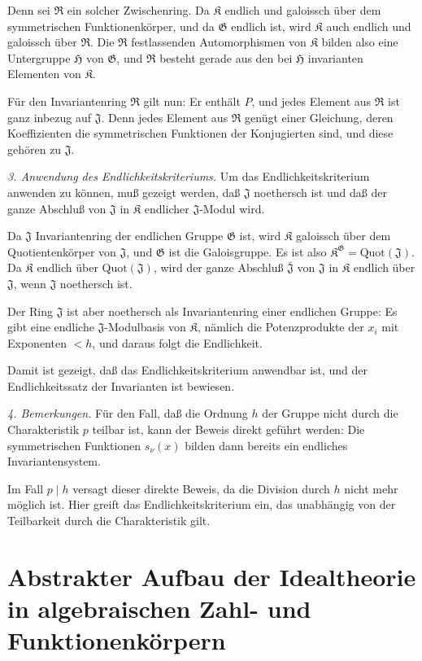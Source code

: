 \documentclass[12pt,a4paper]{article}
\newcommand{\fR}{\mathfrak{R}}
\newcommand{\fG}{\mathfrak{G}}
\newcommand{\fJ}{\mathfrak{J}}
\newcommand{\fK}{\mathfrak{K}}
\theoremstyle{plain}
\theoremstyle{definition}
\theoremstyle{remark}
\begin{document}
Denn sei $\fR$ ein solcher Zwischenring. Da $\fK$ endlich und galoissch über dem symmetrischen Funktionenkörper, und da $\fG$ endlich ist, wird $\fK$ auch endlich und galoissch über $\fR$. Die $\fR$ festlassenden Automorphismen von $\fK$ bilden also eine Untergruppe $\mathfrak{H}$ von $\fG$, und $\fR$ besteht gerade aus den bei $\mathfrak{H}$ invarianten Elementen von $\fK$.

Für den Invariantenring $\fR$ gilt nun: Er enthält $P$, und jedes Element aus $\fR$ ist ganz inbezug auf $\fJ$. Denn jedes Element aus $\fR$ genügt einer Gleichung, deren Koeffizienten die symmetrischen Funktionen der Konjugierten sind, und diese gehören zu $\fJ$.

\textit{3. Anwendung des Endlichkeitskriteriums.} Um das Endlichkeitskriterium anwenden zu können, muß gezeigt werden, daß $\fJ$ noethersch ist und daß der ganze Abschluß von $\fJ$ in $\fK$ endlicher $\fJ$-Modul wird.

Da $\fJ$ Invariantenring der endlichen Gruppe $\fG$ ist, wird $\fK$ galoissch über dem Quotientenkörper von $\fJ$, und $\fG$ ist die Galoisgruppe. Es ist also $\fK^{\fG} = \text{Quot}(\fJ)$. Da $\fK$ endlich über $\text{Quot}(\fJ)$, wird der ganze Abschluß $\bar{\fJ}$ von $\fJ$ in $\fK$ endlich über $\fJ$, wenn $\fJ$ noethersch ist.

Der Ring $\fJ$ ist aber noethersch als Invariantenring einer endlichen Gruppe: Es gibt eine endliche $\fJ$-Modulbasis von $\fK$, nämlich die Potenzprodukte der $x_{i}$ mit Exponenten $< h$, und daraus folgt die Endlichkeit.

Damit ist gezeigt, daß das Endlichkeitskriterium anwendbar ist, und der Endlichkeitssatz der Invarianten ist bewiesen.

\textit{4. Bemerkungen.} Für den Fall, daß die Ordnung $h$ der Gruppe nicht durch die Charakteristik $p$ teilbar ist, kann der Beweis direkt geführt werden: Die symmetrischen Funktionen $s_{\nu}(x)$ bilden dann bereits ein endliches Invariantensystem.

Im Fall $p \mid h$ versagt dieser direkte Beweis, da die Division durch $h$ nicht mehr möglich ist. Hier greift das Endlichkeitskriterium ein, das unabhängig von der Teilbarkeit durch die Charakteristik gilt.

\newpage
\section*{Abstrakter Aufbau der Idealtheorie in algebraischen Zahl- und Funktionenkörpern}
\end{document}
